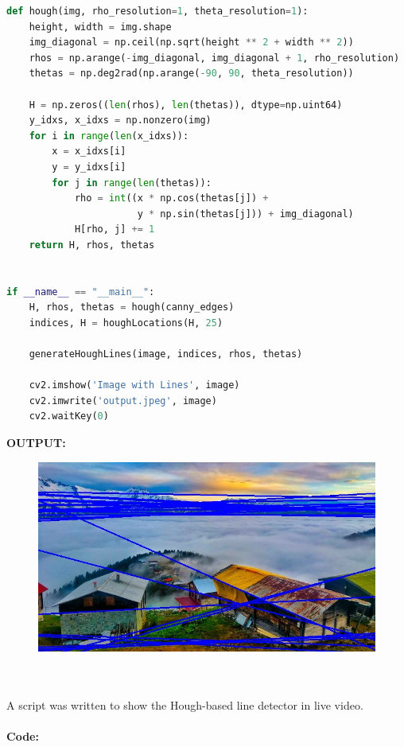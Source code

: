 \documentclass[a4paper, 12pt]{report}
\begin{document}
{{\begin{lstlisting}[language=Python]
def hough(img, rho_resolution=1, theta_resolution=1):
    height, width = img.shape
    img_diagonal = np.ceil(np.sqrt(height ** 2 + width ** 2))
    rhos = np.arange(-img_diagonal, img_diagonal + 1, rho_resolution)
    thetas = np.deg2rad(np.arange(-90, 90, theta_resolution))

    H = np.zeros((len(rhos), len(thetas)), dtype=np.uint64)
    y_idxs, x_idxs = np.nonzero(img)
    for i in range(len(x_idxs)):
        x = x_idxs[i]
        y = y_idxs[i]
        for j in range(len(thetas)):
            rho = int((x * np.cos(thetas[j]) +
                       y * np.sin(thetas[j])) + img_diagonal)
            H[rho, j] += 1
    return H, rhos, thetas


if __name__ == "__main__":
    H, rhos, thetas = hough(canny_edges)
    indices, H = houghLocations(H, 25)

    generateHoughLines(image, indices, rhos, thetas)

    cv2.imshow('Image with Lines', image)
    cv2.imwrite('output.jpeg', image)
    cv2.waitKey(0)


\end{lstlisting}
\textbf{OUTPUT:}

\begin{figure}[h]
\includegraphics[scale=.33]{output.jpeg}
\centering
\end{figure}


\\ \\
A script was written to show the Hough-based line detector in live video.
\\ \\
\textbf{Code:}


}}
\end{document}
